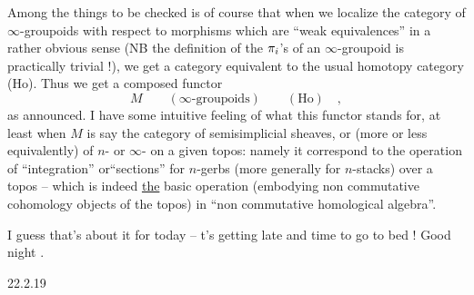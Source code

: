 Among the things to be checked is of course that when we localize the category of \deleted{\unsure{(}}$\infty$-groupoids with respect to morphisms which are ``weak equivalences'' in a rather obvious sense (NB the definition of the $\pi_i$'s of an $\infty$-groupoid is practically trivial !), we get a category equivalent to the usual homotopy category (Ho). Thus we get a composed functor
\[
M\qquad (\infty\text{-groupoids})\qquad(\mathrm{Ho})\quad ,
\]
as announced. I have some intuitive feeling of what this functor stands for, at least when $M$ is say the category of semisimplicial sheaves, or (more or less equivalently) of $n$- or $\infty$- on a given topos: namely it  correspond to the operation of ``integration'' or``sections'' for $n$-gerbs (more generally for $n$-stacks) over a topos -- which is indeed \uline{the} basic operation (embodying non commutative cohomology objects of the topos) in ``non commutative homological algebra''.

I guess that's about it for today -- t's getting late and time to go to bed ! Good night .


\hfill 22.2.19\\

